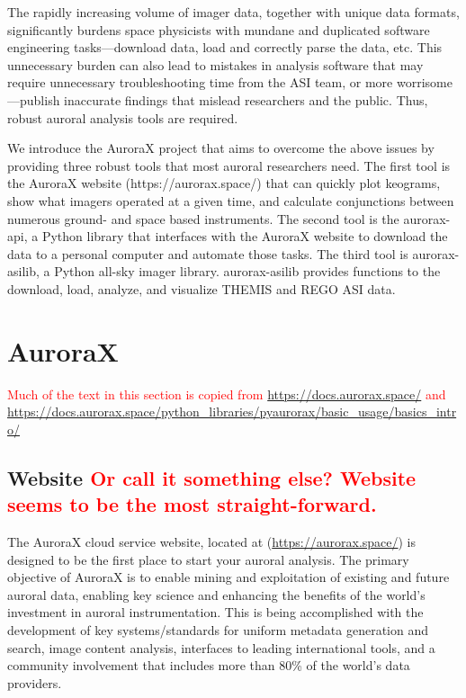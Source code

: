 \documentclass[draft]{agujournal2019}
\begin{document}
The rapidly increasing volume of imager data, together with unique data formats, significantly burdens space physicists with mundane and duplicated software engineering tasks---download data, load and correctly parse the data, etc. This unnecessary burden can also lead to mistakes in analysis software that may require unnecessary troubleshooting time from the ASI team, or more worrisome---publish inaccurate findings that mislead researchers and the public. Thus, robust auroral analysis tools are required.

We introduce the AuroraX project that aims to overcome the above issues by providing three robust tools that most auroral researchers need. The first tool is the AuroraX website (https://aurorax.space/) that can quickly plot keograms, show what imagers operated at a given time, and calculate conjunctions between numerous ground- and space based instruments. The second tool is the aurorax-api, a Python library that interfaces with the AuroraX website to download the data to a personal computer and automate those tasks. The third tool is aurorax-asilib, a Python all-sky imager library. aurorax-asilib provides functions to the download, load, analyze, and visualize THEMIS and REGO ASI data. 

\section{AuroraX}\label{aurorax}
\textcolor{red}{Much of the text in this section is copied from \url{https://docs.aurorax.space/} and \url{https://docs.aurorax.space/python_libraries/pyaurorax/basic_usage/basics_intro/}}

\subsection{Website \textcolor{red}{Or call it something else? Website seems to be the most straight-forward.}}
The AuroraX cloud service website, located at (\url{https://aurorax.space/}) is designed to be the first place to start your auroral analysis. The primary objective of AuroraX is to enable mining and exploitation of existing and future auroral data, enabling key science and enhancing the benefits of the world's investment in auroral instrumentation. This is being accomplished with the development of key systems/standards for uniform metadata generation and search, image content analysis, interfaces to leading international tools, and a community involvement that includes more than 80\% of the world's data providers.
\end{document}
